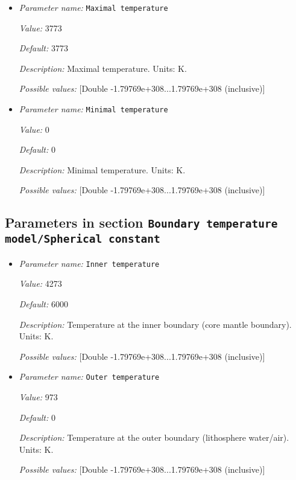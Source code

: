 \begin{itemize}
\item {\it Parameter name:} {\tt Maximal temperature}


{\it Value:} 3773


{\it Default:} 3773


{\it Description:} Maximal temperature. Units: K.


{\it Possible values:} [Double -1.79769e+308...1.79769e+308 (inclusive)]
\item {\it Parameter name:} {\tt Minimal temperature}


{\it Value:} 0


{\it Default:} 0


{\it Description:} Minimal temperature. Units: K.


{\it Possible values:} [Double -1.79769e+308...1.79769e+308 (inclusive)]
\end{itemize}

\subsection{Parameters in section \tt Boundary temperature model/Spherical constant}
\label{parameters:Boundary_20temperature_20model/Spherical_20constant}

\begin{itemize}
\item {\it Parameter name:} {\tt Inner temperature}


{\it Value:} 4273


{\it Default:} 6000


{\it Description:} Temperature at the inner boundary (core mantle boundary). Units: K.


{\it Possible values:} [Double -1.79769e+308...1.79769e+308 (inclusive)]
\item {\it Parameter name:} {\tt Outer temperature}


{\it Value:} 973


{\it Default:} 0


{\it Description:} Temperature at the outer boundary (lithosphere water/air). Units: K.


{\it Possible values:} [Double -1.79769e+308...1.79769e+308 (inclusive)]
\end{itemize}

